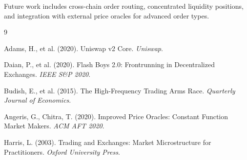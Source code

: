 \documentclass[11pt,a4paper]{article}
\theoremstyle{definition}
\begin{document}
Future work includes cross-chain order routing, concentrated liquidity positions, and integration with external price oracles for advanced order types.


\begin{thebibliography}{9}

Adams, H., et al. (2020). Uniswap v2 Core. \textit{Uniswap}.

Daian, P., et al. (2020). Flash Boys 2.0: Frontrunning in Decentralized Exchanges. \textit{IEEE S\&P 2020}.

Budish, E., et al. (2015). The High-Frequency Trading Arms Race. \textit{Quarterly Journal of Economics}.

Angeris, G., Chitra, T. (2020). Improved Price Oracles: Constant Function Market Makers. \textit{ACM AFT 2020}.

Harris, L. (2003). Trading and Exchanges: Market Microstructure for Practitioners. \textit{Oxford University Press}.

\end{thebibliography}
\end{document}
